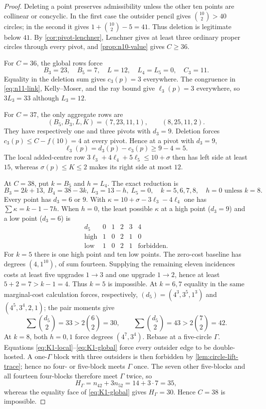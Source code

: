 \begin{proof}
Deleting a point preserves admissibility unless the other ten points are
collinear or concyclic.  In the first case the outsider pencil gives
$\binom{10}{2}>40$ circles; in the second it gives
$1+\binom{10}{2}-5=41$.  Thus deletion is legitimate below $41$.
 By \cref{cor:pivot-lenchner}, Lenchner gives at least three ordinary proper
 circles through every pivot, and \cref{prop:n10-value} gives $C\ge36$.

For $C=36$, the global rows force
\[
B_3=23,\quad B_5=7,\quad L=12,\quad L_4=L_5=0,
\quad C_3=11.
\]
Equality in the deletion sum gives $c_3(p)=3$ everywhere.  The congruence
in \eqref{eq:n11-link}, Kelly--Moser, and the ray bound give
$\ell_3(p)=3$ everywhere, so $3L_3=33$ although $L_3=12$.

For $C=37$, the only aggregate rows are
\[
(B_5,B_3,L,K)=(7,23,11,1),\qquad(8,25,11,2).
\]
They have respectively one and three pivots with $d_3=9$.  Deletion forces
$c_3(p)\le C-f(10)=4$ at every pivot.  Hence at a pivot with $d_3=9$,
\[
 \ell_3(p)=d_3(p)-c_3(p)\ge9-4=5.
\]
The local added-centre row
$3\ell_3+4\ell_4+5\ell_5\le10+\sigma$ then has left side at least
$15$, whereas $\sigma(p)\le K\le2$ makes its right side at most $12$.

At $C=38$, put $k=B_5$ and $h=L_4$.  The exact reduction is
\begin{equation}\label{eq:n11-C38-front}
B_3=2k+13,\ B_4=38-3k,\ L_3=13-h,\ L_5=0,
\quad k=5,6,7,8,\quad h=0\text{ unless }k=8.
\end{equation}
Every point has $d_3=6$ or $9$.  With
$\kappa=10+\sigma-3\ell_3-4\ell_4$ one has
$\sum\kappa=k-1-7h$.  When $h=0$, the least possible $\kappa$ at a high
point ($d_3=9$) and a low point ($d_3=6$) is
\[
\begin{array}{c|ccccc}
d_5&0&1&2&3&4\\ \hline
\text{high}&1&0&2&1&0\\
\text{low}&1&0&2&1&\text{forbidden}.
\end{array}
\]
For $k=5$ there is one high point and ten low points.  The zero-cost
baseline has degrees $(4,1^{10})$, of sum fourteen.  Supplying the remaining
eleven incidences costs at least five upgrades $1\to3$ and one upgrade
$1\to2$, hence at least $5+2=7>k-1=4$.  Thus $k=5$ is impossible.
At $k=6,7$ equality in the same marginal-cost calculation forces,
respectively,
$(d_5)=(4^3,3^5,1^3)$ and $(4^5,3^4,2,1)$; the pair moments give
\[
\sum\binom{d_5}2=33>2\binom62=30,
\qquad
\sum\binom{d_5}2=43>2\binom72=42.
\]
At $k=8$, both $h=0,1$ force degrees $(4^7,3^4)$.  Rebase at a five-circle
$\Gamma$.  Equations \eqref{eq:K1-local}--\eqref{eq:K1-global} force every
outsider edge to be double-hosted.  A one-$\Gamma$ block with three
outsiders is then forbidden by \cref{lem:circle-lift-trace}; hence no
four- or five-block meets $\Gamma$ once.  The seven other five-blocks and
all fourteen four-blocks therefore meet $\Gamma$ twice, so
\[
H_\Gamma=n_{42}+3n_{52}=14+3\cdot7=35,
\]
whereas the equality face of \eqref{eq:K1-global} gives
$H_\Gamma=30$.  Hence $C=38$ is impossible.
\end{proof}

